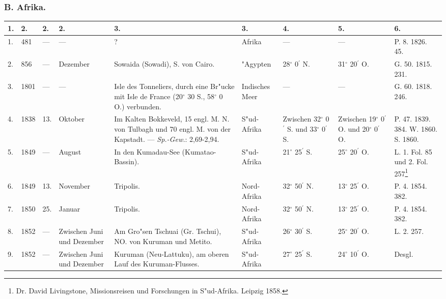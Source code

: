 \documentclass[a4paper, 8pt, oneside, polutonikogreek, german]{article}
\begin{document}
\subsubsection{B. Afrika.}
\begin{center}
    \footnotesize
    \begin{longtable}{|p{3mm}|p{6mm}|p{8mm}|p{15mm}|p{25mm}|p{15mm}|p{13mm}|p{13mm}|p{13mm}|}
    \hline
        1. & 2. & 2. & 2. & 3. & 3. & 4. & 5. & 6. \\ \hline
        1. & 481 & --- & --- & ? & Afrika & --- & --- & P. 8. 1826. 45. \\ \hline
        2. & 856 & --- & Dezember & Sowaida (Sowadi), S. von Cairo. & "Agypten & 28$^\circ$ 0$^\prime$ N. & 31$^\circ$ 20$^\prime$ O. & G. 50. 1815. 231. \\ \hline
        3. & 1801 & --- & --- & Isle des Tonneliers, durch eine Br"ucke mit Isle de France (20$^\circ$ 30 S., 58$^\circ$ 0 O.) verbunden. & Indisches Meer & --- & --- & G. 60. 1818. 246. \\ \hline
        4. & 1838 & 13. & Oktober & Im Kalten Bokkeveld, 15 engl. M. N. von Tulbagh und 70 engl. M. von der Kapstadt. --- \emph{Sp.-Gew.}: 2,69-2,94. & S"ud-Afrika & Zwischen 32$^\circ$ 0$^\prime$ S. und 33$^\circ$ 0$^\prime$ S. & Zwischen 19$^\circ$ 0$^\prime$ O. und 20$^\circ$ 0$^\prime$ O. & P. 47. 1839. 384. W. 1860. S. 1860. \\ \hline
        5. & 1849 & --- & August & In den Kumadau-See (Kumatao-Bassin). & S"ud-Afrika & 21$^\circ$ 25$^\prime$ S. & 25$^\circ$ 20$^\prime$ O. & L. 1. Fol. 85 und 2. Fol. 257\footnote{Dr. David Livingstone, Missionsreisen und Forschungen in S"ud-Afrika. Leipzig 1858.} \\ \hline
        6. & 1849 & 13. & November & Tripolis. & Nord-Afrika & 32$^\circ$ 50$^\prime$ N. & 13$^\circ$ 25$^\prime$ O. & P. 4. 1854. 382. \\ \hline
        7. & 1850 & 25. & Januar & Tripolis. & Nord-Afrika & 32$^\circ$ 50$^\prime$ N. & 13$^\circ$ 25$^\prime$ O. & P. 4. 1854. 382. \\ \hline
        8. & 1852 & --- & Zwischen Juni und Dezember & Am Gro"sen Tschuai (Gr. Tschui), NO. von Kuruman und Metito. & S"ud-Afrika & 26$^\circ$ 30$^\prime$ S. & 25$^\circ$ 20$^\prime$ O. & L. 2. 257. \\ \hline
        9. & 1852 & --- & Zwischen Juni und Dezember & Kuruman (Neu-Lattuku), am oberen Lauf des Kuruman-Flusses. & S"ud-Afrika & 27$^\circ$ 25$^\prime$ S. & 24$^\circ$ 10$^\prime$ O. & Desgl. \\ \hline

\end{longtable}
\end{center}
\end{document}
